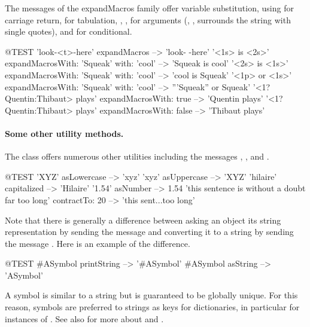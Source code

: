 \documentclass[a4paper,10pt,twoside]{book}
\begin{document}
The messages of the expandMacros family offer variable substitution, using  for carriage return,  for tabulation, , ,  for arguments (, , surrounds the string with single quotes), and  for conditional.

\begin{code}{@TEST}
'look-<t>-here' expandMacros                                         --> 'look-	-here'
'<1s> is <2s>' expandMacrosWith: 'Squeak' with: 'cool'   --> 'Squeak is cool'
'<2s> is <1s>' expandMacrosWith: 'Squeak' with: 'cool'   --> 'cool is Squeak'
'<1p> or <1s>' expandMacrosWith: 'Squeak' with: 'cool'  --> '''Squeak'' or Squeak'
'<1?Quentin:Thibaut> plays' expandMacrosWith: true     --> 'Quentin plays'
'<1?Quentin:Thibaut> plays' expandMacrosWith: false    --> 'Thibaut plays'
\end{code}

\paragraph{Some other utility methods.}
The class  offers numerous other utilities including the messages , , and .

\begin{code}{@TEST}
'XYZ' asLowercase --> 'xyz'
'xyz' asUppercase   --> 'XYZ'
'hilaire' capitalized   --> 'Hilaire'
'1.54' asNumber      --> 1.54
'this sentence is without a doubt far too long' contractTo: 20 --> 'this sent...too long'
\end{code}

Note that there is generally a difference between asking an object its string representation by sending the message  and converting it to a string by sending the message .
Here is an example of the difference.

\begin{code}{@TEST}
#ASymbol printString --> '#ASymbol'
#ASymbol asString    --> 'ASymbol'
\end{code}

A symbol is similar to a string but is guaranteed to be globally unique.
For this reason, symbols are preferred to strings as keys for dictionaries, in particular for instances of .
See also  for more about  and .

\end{document}
